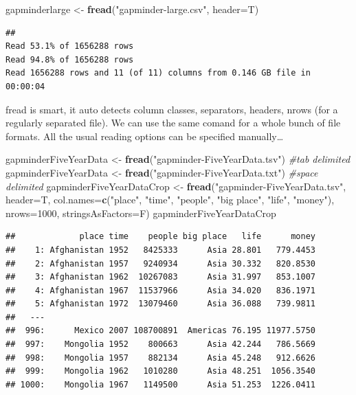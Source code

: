 \documentclass[]{article}
\newenvironment{Shaded}{\begin{snugshade}}{\end{snugshade}}
\newcommand{\KeywordTok}[1]{\textcolor[rgb]{0.13,0.29,0.53}{\textbf{{#1}}}}
\newcommand{\DataTypeTok}[1]{\textcolor[rgb]{0.13,0.29,0.53}{{#1}}}
\newcommand{\DecValTok}[1]{\textcolor[rgb]{0.00,0.00,0.81}{{#1}}}
\newcommand{\StringTok}[1]{\textcolor[rgb]{0.31,0.60,0.02}{{#1}}}
\newcommand{\CommentTok}[1]{\textcolor[rgb]{0.56,0.35,0.01}{\textit{{#1}}}}
\newcommand{\NormalTok}[1]{{#1}}
\begin{document}
\begin{Shaded}
\begin{Highlighting}[]
\NormalTok{gapminderlarge <-}\StringTok{ }\KeywordTok{fread}\NormalTok{(}\StringTok{"gapminder-large.csv"}\NormalTok{, }\DataTypeTok{header=}\NormalTok{T)}
\end{Highlighting}
\end{Shaded}

\begin{verbatim}
## 
Read 53.1% of 1656288 rows
Read 94.8% of 1656288 rows
Read 1656288 rows and 11 (of 11) columns from 0.146 GB file in 00:00:04
\end{verbatim}

fread is smart, it auto detects column classes, separators, headers,
nrows (for a regularly separated file). We can use the same comand for a
whole bunch of file formats. All the usual reading options can be
specified manually\ldots{}

\begin{Shaded}
\begin{Highlighting}[]
\NormalTok{gapminderFiveYearData <-}\StringTok{ }\KeywordTok{fread}\NormalTok{(}\StringTok{"gapminder-FiveYearData.tsv"}\NormalTok{) }\CommentTok{#tab delimited}
\NormalTok{gapminderFiveYearData <-}\StringTok{ }\KeywordTok{fread}\NormalTok{(}\StringTok{"gapminder-FiveYearData.txt"}\NormalTok{) }\CommentTok{#space delimited}
\NormalTok{gapminderFiveYearDataCrop <-}\StringTok{ }\KeywordTok{fread}\NormalTok{(}\StringTok{"gapminder-FiveYearData.tsv"}\NormalTok{, }\DataTypeTok{header=}\NormalTok{T, }\DataTypeTok{col.names=}\KeywordTok{c}\NormalTok{(}\StringTok{"place"}\NormalTok{, }\StringTok{"time"}\NormalTok{, }\StringTok{"people"}\NormalTok{, }\StringTok{"big place"}\NormalTok{, }\StringTok{"life"}\NormalTok{, }\StringTok{"money"}\NormalTok{), }\DataTypeTok{nrows=}\DecValTok{1000}\NormalTok{, }\DataTypeTok{stringsAsFactors=}\NormalTok{F)}
\NormalTok{gapminderFiveYearDataCrop}
\end{Highlighting}
\end{Shaded}

\begin{verbatim}
##             place time    people big place   life      money
##    1: Afghanistan 1952   8425333      Asia 28.801   779.4453
##    2: Afghanistan 1957   9240934      Asia 30.332   820.8530
##    3: Afghanistan 1962  10267083      Asia 31.997   853.1007
##    4: Afghanistan 1967  11537966      Asia 34.020   836.1971
##    5: Afghanistan 1972  13079460      Asia 36.088   739.9811
##   ---                                                       
##  996:      Mexico 2007 108700891  Americas 76.195 11977.5750
##  997:    Mongolia 1952    800663      Asia 42.244   786.5669
##  998:    Mongolia 1957    882134      Asia 45.248   912.6626
##  999:    Mongolia 1962   1010280      Asia 48.251  1056.3540
## 1000:    Mongolia 1967   1149500      Asia 51.253  1226.0411
\end{verbatim}
\end{document}
